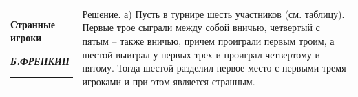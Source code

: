 \documentclass[10pt,onecolumn,a4paper]{article}
\begin{document}
\thispagestyle{fancy}
\fancyhead{} 
\begin{center}
\begin{tabular}{  m{12cm} m{7cm} } 
\begin{center}
\huge\textbf{Странные игроки}

\normalsize\textit{\textbf{Б.ФРЕНКИН}}\end{center}\hrule&Решение. а) Пусть в турнире шесть участников (см. таблицу). Первые трое сыграли между собой вничью, четвертый с пятым – также вничью, причем проиграли первым троим, а шестой выиграл у первых трех и проиграл четвертому и пятому. Тогда шестой разделил первое место с первыми тремя игроками и при этом является странным.

\end{tabular}
\end{center}
\end{document}
